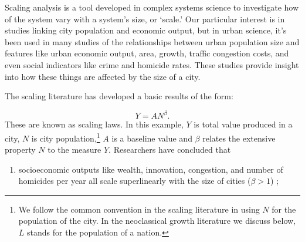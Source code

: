 {Scaling analysis is a tool developed in \glspl{complex system} science to investigate how  of the system vary with a system's size,  or `scale.' Our particular interest is in studies linking city population and economic output, but in urban science, it's been used in many studies of the relationships between urban population size and features like urban economic output, area, growth, traffic congestion costs, and even social indicators like crime and homicide rates. These studies provide insight into how these things are affected by the size of a city. 

The scaling literature has developed %
a basic results of the form: 

\begin{equation}
Y=AN^\beta.
\end{equation} 
These are known as \glspl{scaling law}. In this example, $Y$ is total value produced in a city, $N$ is city population,\footnote{We follow the common convention in the scaling literature  in using $N$ for the population of the city. In the neoclassical growth literature we discuss below, $L$ stands for the population of a nation.} $A$ is a baseline value and $\beta$ relates the \gls{extensive property} $N$ to the measure $Y$. Researchers have concluded that 

\begin{enumerate}
 \item socioeconomic outputs like wealth, innovation, congestion, and number of homicides per year all scale superlinearly with the size of cities ($\beta > 1$) \cite{gomez-lievanoStatisticsUrbanScaling2012};
\vspace{.25cm}
 


\end{enumerate}}

